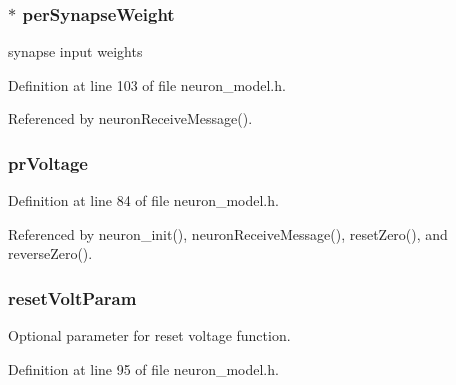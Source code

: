 \hypertarget{structneuron_state_ac21457aec3f29f9f28b58dd95e3d6fb2}{}
\subsubsection[{per\+Synapse\+Weight}]{$\ast$ per\+Synapse\+Weight}\label{structneuron_state_ac21457aec3f29f9f28b58dd95e3d6fb2}


synapse input weights 



Definition at line 103 of file neuron\+\_\+model.\+h.



Referenced by neuron\+Receive\+Message().

\hypertarget{structneuron_state_ac20c9ef5b5825eb38f91c1f1dacfb21d}{}
\subsubsection[{pr\+Voltage}]{ pr\+Voltage}\label{structneuron_state_ac20c9ef5b5825eb38f91c1f1dacfb21d}


Definition at line 84 of file neuron\+\_\+model.\+h.



Referenced by neuron\+\_\+init(), neuron\+Receive\+Message(), reset\+Zero(), and reverse\+Zero().

\hypertarget{structneuron_state_a1c0cef684666b681d30112c72e18bead}{}
\subsubsection[{reset\+Volt\+Param}]{ reset\+Volt\+Param}\label{structneuron_state_a1c0cef684666b681d30112c72e18bead}


Optional parameter for reset voltage function. 



Definition at line 95 of file neuron\+\_\+model.\+h.



